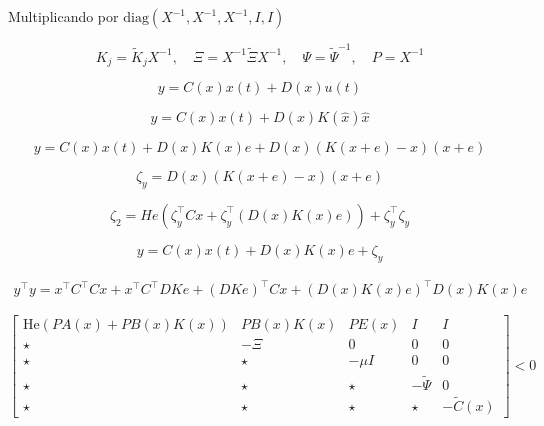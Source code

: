 Multiplicando por $\text{diag}(X^{-1}, X^{-1},  X^{-1}, I, I)$

\begin{equation}
  K_j = \tilde K_j X^{-1}, \quad \Xi = X^{-1} \tilde \Xi X^{-1}, \quad \Psi = \tilde \Psi^{-1}, \quad P = X^{-1}
\end{equation}

\begin{equation}
  y = C(x) x(t) + D(x) u(t)
\end{equation}

\begin{equation}
  y = C(x) x(t) + D(x) K(\hat x) \hat{x}
\end{equation}

\begin{equation}
  y = C(x) x(t) + D(x) K(x) e + D(x) \left(K(x+e) - x\right)(x+e)
\end{equation}

\begin{equation}
  \zeta_y =  D(x) \left(K(x+e) - x\right)(x+e)
\end{equation}

\begin{equation}
  \zeta_2 =  He (\zeta_y^{\top}Cx  + \zeta_y^{\top}(D(x) K(x) e)) + \zeta_y^{\top} \zeta_y
\end{equation}

\begin{equation}
  y = C(x) x(t) + D(x) K(x) e + \zeta_y
\end{equation}

\begin{gather}
  y^{\top} y = x^{\top} C^{\top} C x + x^{\top} C^{\top} D K e + (D K e)^{\top} C x + (D(x) K(x) e)^{\top} D(x) K(x) e
\end{gather}


\begin{equation}
  \begin{bmatrix}
    \text{He}(PA(x) + PB(x)K(x)) & PB(x)K(x) & P E(x) & I             & I                  \\
    \star                        & -\Xi      & 0      & 0             & 0                  \\
    \star                        & \star     & -\mu I & 0             & 0                  \\
    \star                        & \star     & \star  & - \tilde \Psi & 0                  \\
    \star                        & \star     & \star  & \star         & - \tilde{C}(x)
  \end{bmatrix} < 0
\end{equation}

